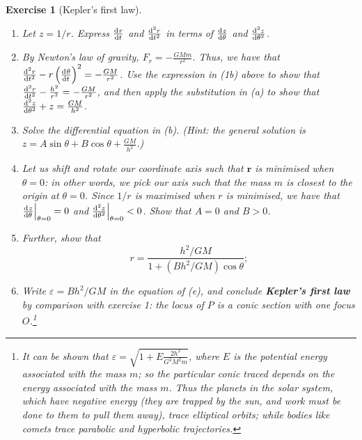 \documentclass[a4paper,leqno,10pt]{article}
\theoremstyle{exercise}
\newtheorem{Exercise}{Exercise}
\newenvironment{exercise}
  {\begin{mdframed}\begin{Exercise}}
  {\end{Exercise}\end{mdframed}}
\theoremstyle{plain}
\theoremstyle{definition}
\theoremstyle{remark}
\newcommand{\df}{\textbf}
\renewcommand\vec{\mathbf}
\begin{document}
\begin{exercise}[Kepler's first law]
  \begin{enumerate}
    \item Let $ z = 1/r $. Express $ \od{r}{t} $ and $ \od[2]{r}{t} $ in terms of $ \od{z}{\theta} $ and $ \od[2]{z}{\theta} $.
    \item By Newton's law of gravity, $ F_r = -\frac{GMm}{r^2} $. Thus, we have that $ \od[2]{r}{t} - r \left(\od{\theta}{t}\right)^2 = -\frac{GM}{r^2} $.
          Use the expression in (1b) above to show that $ \od[2]{r}{t} - \frac{h^2}{r^3} = -\frac{GM}{r^2} $, and then apply
          the substitution in (a) to show that $ \od[2]{z}{\theta} + z = \frac{GM}{h^2} $.
    \item Solve the differential equation in (b). (Hint: the general solution is $ z = A \sin \theta + B \cos \theta + \frac{GM}{h^2} $.)
    \item Let us shift and rotate our coordinate axis such that $ \vec{r} $ is minimised when $ \theta = 0 $: in other words, we pick
          our axis such that the mass $ m $ is closest to the origin at $ \theta = 0 $. Since $ 1/r $ is maximised when $ r $ is minimised,
          we have that $ \eval[2]{\od{z}{\theta}}_{\theta = 0} = 0 $ and $ \eval[2]{\od[2]{z}{\theta}}_{\theta = 0} < 0 $. Show that $ A = 0 $
          and $ B > 0 $.
    \item Further, show that
          \begin{displaymath}
            r = \frac{h^2/GM}{1 + (Bh^2/GM)\cos\theta};
          \end{displaymath}
    \item Write $ \varepsilon = Bh^2/GM $ in the equation of (e), and conclude \df{Kepler's first law} by comparison
          with exercise 1: the locus of $ P $ is a conic section with one focus $ O $.\footnote{It can be shown
          that $ \varepsilon = \sqrt{1 + E \frac{2h^2}{G^2M^2m}} $, where $ E $ is the potential energy associated with the mass $ m $; so
          the particular conic traced depends on the energy associated with the mass $ m $. Thus the planets in
          the solar system, which have negative energy (they are trapped by the sun, and work must be done to them
          to pull them away), trace elliptical orbits; while bodies like comets trace parabolic and hyperbolic trajectories.}
  \end{enumerate}
\end{exercise}
\end{document}
